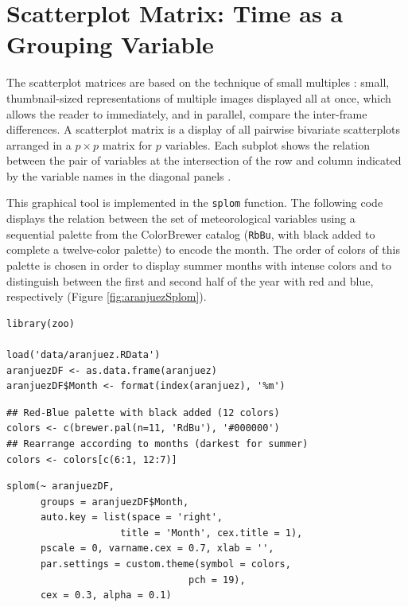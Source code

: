 
\section{Scatterplot Matrix: Time as a Grouping Variable \label{SEC:groupVariable}}
\label{sec:org8e8055b}

The scatterplot matrices are based on the technique of small multiples
\cite{Tufte1990}: small, thumbnail-sized representations of multiple
images displayed all at once, which allows the reader to immediately,
and in parallel, compare the inter-frame differences.  A scatterplot
matrix is a display of all pairwise bivariate scatterplots arranged in
a \(p \times p\) matrix for \(p\) variables. Each subplot shows the
relation between the pair of variables at the intersection of the row
and column indicated by the variable names in the diagonal panels
\cite{Friendly.Denis2005}.

This graphical tool is implemented in the \texttt{splom} function. The
following code displays the relation between the set of
meteorological variables using a sequential palette from the
ColorBrewer catalog (\texttt{RbBu}, with black added to complete a
twelve-color palette) to encode the month. The order of colors of
this palette is chosen in order to display summer months with
intense colors and to distinguish between the first and second
half of the year with red and blue, respectively (Figure
\ref{fig:aranjuezSplom}).



\lstset{language=r,label= ,caption= ,captionpos=b,numbers=none}
\begin{lstlisting}
library(zoo)

load('data/aranjuez.RData')
aranjuezDF <- as.data.frame(aranjuez)
aranjuezDF$Month <- format(index(aranjuez), '%m')
\end{lstlisting}

\lstset{language=r,label= ,caption= ,captionpos=b,numbers=none}
\begin{lstlisting}
## Red-Blue palette with black added (12 colors)
colors <- c(brewer.pal(n=11, 'RdBu'), '#000000')
## Rearrange according to months (darkest for summer)
colors <- colors[c(6:1, 12:7)]
\end{lstlisting}

\lstset{language=r,label= ,caption= ,captionpos=b,numbers=none}
\begin{lstlisting}
splom(~ aranjuezDF, 
      groups = aranjuezDF$Month,
      auto.key = list(space = 'right', 
                    title = 'Month', cex.title = 1),
      pscale = 0, varname.cex = 0.7, xlab = '',
      par.settings = custom.theme(symbol = colors,
                                pch = 19),
      cex = 0.3, alpha = 0.1)
\end{lstlisting}

